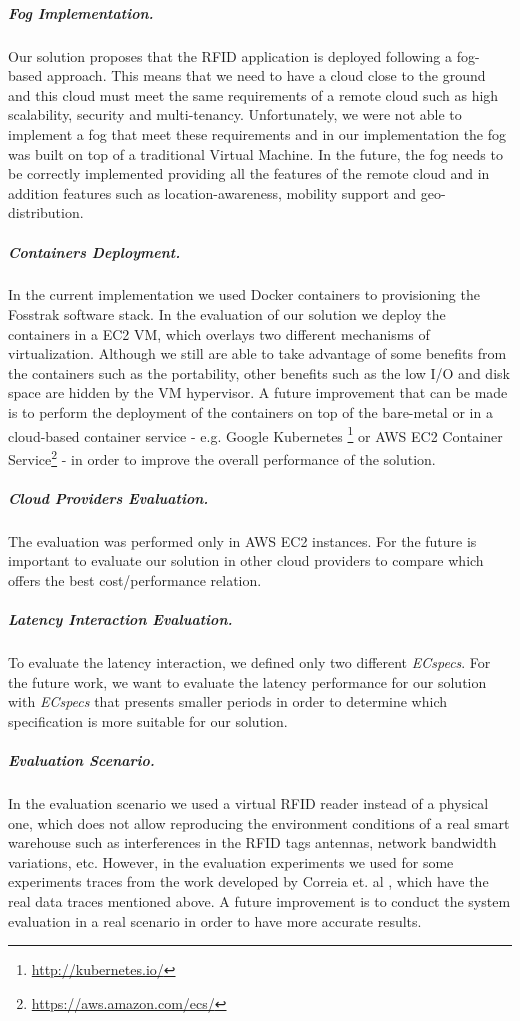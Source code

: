 \subparagraph{Fog Implementation.}
\label{subp:fog_impl}
Our solution proposes that the \gls{RFID} application is deployed following a fog-based approach.
This means that we need to have a cloud close to the ground and this cloud must meet the same
requirements of a remote cloud such as high scalability, security and multi-tenancy. Unfortunately,
we were not able to implement a fog that meet these requirements and in our implementation the fog
was built on top of a traditional Virtual Machine. In the future, the fog needs to be correctly
implemented providing all the features of the remote cloud and in addition features such as
location-awareness, mobility support and geo-distribution.

\subparagraph{Containers Deployment.}
\label{subp:containers_impl}
In the current implementation we used Docker containers to provisioning the Fosstrak software stack.
In the evaluation of our solution we deploy the containers in a \gls{EC2} \gls{VM}, which overlays two
different mechanisms of virtualization. Although we still are able to take advantage of some benefits
from the containers such as the portability, other benefits such as the low I/O and disk space are
hidden by the \gls{VM} hypervisor. A future improvement that can be made is to perform the deployment
of the containers on top of the bare-metal or in a cloud-based container service - e.g. Google Kubernetes
\footnote{\url{http://kubernetes.io/}} or \gls{AWS} \gls{EC2} Container Service\footnote{\url{https://aws.amazon.com/ecs/}} -
in order to improve the overall performance of the solution.

\subparagraph{Cloud Providers Evaluation.}
\label{subp:cloud_eval}
The evaluation was performed only in \gls{AWS} \gls{EC2} instances. For the future is important to
evaluate our solution in other cloud providers to compare which offers the best cost/performance
relation.

\subparagraph{Latency Interaction Evaluation.}
\label{subp:latency_eval}
To evaluate the latency interaction, we defined only two different \textit{ECspecs}. For the future work,
we want to evaluate the latency performance for our solution with \textit{ECspecs} that presents smaller
periods in order to determine which specification is more suitable for our solution.

\subparagraph{Evaluation Scenario.}
\label{subp:scenario_eval}
In the evaluation scenario we used a virtual \gls{RFID} reader instead of a physical one, which does
not allow reproducing the environment conditions of a real smart warehouse such as interferences in
the \gls{RFID} tags antennas, network bandwidth variations, etc. However, in the evaluation experiments
we used for some experiments traces from the work developed by Correia et. al \cite{Correia:Thesis:2014},
which have the real data traces mentioned above. A future improvement is to conduct the system
evaluation in a real scenario in order to have more accurate results.

